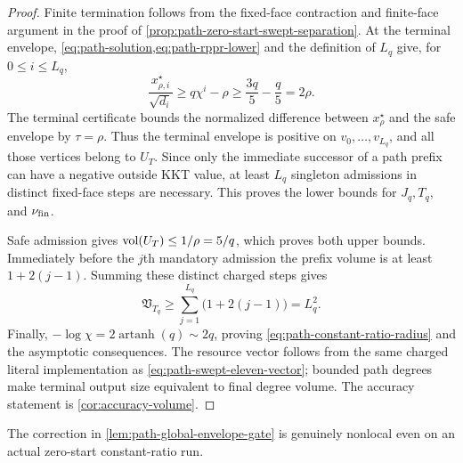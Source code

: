 \begin{proof}
Finite termination follows from the fixed-face contraction and finite-face
argument in the proof of
\cref{prop:path-zero-start-swept-separation}.  At the terminal envelope,
\cref{eq:path-solution,eq:path-rppr-lower} and the definition of $L_q$ give,
for $0\leq i\leq L_q$,
\begin{equation*}
 \frac{x_{\rho,i}^\star}{\sqrt{d_i}}
 \geq q\chi^i-\rho
 \geq\frac{3q}{5}-\frac q5
 =2\rho.
\end{equation*}
The terminal certificate bounds the normalized difference between
$x_\rho^\star$ and the safe envelope by $\tau=\rho$.  Thus the terminal
envelope is positive on $v_0,\ldots,v_{L_q}$, and all those vertices belong
to $U_T$.  Since only the immediate successor of a path prefix can have a
negative outside KKT value, at least $L_q$ singleton admissions in distinct
fixed-face steps are necessary.  This proves the lower bounds for $J_q,T_q$,
and $\nu_{\rm fin}$.

Safe admission gives $\operatorname{vol}(U_T)\leq1/\rho=5/q$, which proves both upper
bounds.  Immediately before the $j$th mandatory admission the prefix volume
is at least $1+2(j-1)$.  Summing these distinct charged steps gives
\begin{equation*}
 \mathfrak V_{T_q}
 \geq\sum_{j=1}^{L_q}\bigl(1+2(j-1)\bigr)=L_q^2.
\end{equation*}
Finally, $-\log\chi=2\operatorname{artanh}(q)\sim2q$, proving
\cref{eq:path-constant-ratio-radius} and the asymptotic consequences.  The
resource vector follows from the same charged literal implementation as
\cref{eq:path-swept-eleven-vector}; bounded path degrees make terminal output
size equivalent to final degree volume.  The accuracy statement is
\cref{cor:accuracy-volume}.
\end{proof}

The correction in \cref{lem:path-global-envelope-gate} is genuinely
nonlocal even on an actual zero-start constant-ratio run.

